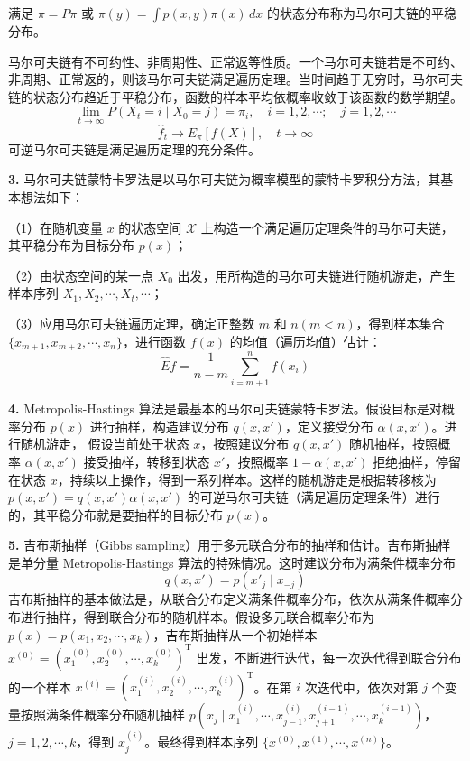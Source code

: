 \documentclass[UTF8,12pt,a4paper,fontset=fandol]{ctexart}
\begin{document}
满足 $\pi=P\pi$ 或 $\pi(y)=\int p(x,y)\pi(x)\,dx$ 的状态分布称为马尔可夫链的平稳分布。

马尔可夫链有不可约性、非周期性、正常返等性质。一个马尔可夫链若是不可约、非周期、正常返的，则该马尔可夫链满足遍历定理。当时间趋于无穷时，马尔可夫链的状态分布趋近于平稳分布，函数的样本平均依概率收敛于该函数的数学期望。
\[
\lim_{t\to\infty}P(X_t=i\mid X_0=j)=\pi_i,\quad i=1,2,\cdots;\quad j=1,2,\cdots
\]
\[
\hat f_t\to E_\pi[f(X)],\quad t\to\infty
\]
可逆马尔可夫链是满足遍历定理的充分条件。

\noindent\textbf{3.} 马尔可夫链蒙特卡罗法是以马尔可夫链为概率模型的蒙特卡罗积分方法，其基本想法如下：

（1）在随机变量 $x$ 的状态空间 $\mathcal{X}$ 上构造一个满足遍历定理条件的马尔可夫链，其平稳分布为目标分布 $p(x)$；

（2）由状态空间的某一点 $X_0$ 出发，用所构造的马尔可夫链进行随机游走，产生样本序列 $X_1,X_2,\cdots,X_t,\cdots$；

（3）应用马尔可夫链遍历定理，确定正整数 $m$ 和 $n(m<n)$，得到样本集合 $\{x_{m+1},x_{m+2},\cdots,x_n\}$，进行函数 $f(x)$ 的均值（遍历均值）估计：
\[
\hat E f=\frac{1}{n-m}\sum_{i=m+1}^{n}f(x_i)
\]

\noindent\textbf{4.} Metropolis-Hastings 算法是最基本的马尔可夫链蒙特卡罗法。假设目标是对概率分布 $p(x)$ 进行抽样，构造建议分布 $q(x,x')$，定义接受分布 $\alpha(x,x')$。进行随机游走，
假设当前处于状态 $x$，按照建议分布 $q(x,x')$ 随机抽样，按照概率 $\alpha(x,x')$ 接受抽样，转移到状态 $x'$，按照概率 $1-\alpha(x,x')$ 拒绝抽样，停留在状态 $x$，持续以上操作，得到一系列样本。这样的随机游走是根据转移核为 $p(x,x')=q(x,x')\alpha(x,x')$ 的可逆马尔可夫链（满足遍历定理条件）进行的，其平稳分布就是要抽样的目标分布 $p(x)$。

\noindent\textbf{5.} 吉布斯抽样（Gibbs sampling）用于多元联合分布的抽样和估计。吉布斯抽样是单分量 Metropolis-Hastings 算法的特殊情况。这时建议分布为满条件概率分布
\[
q(x,x')=p(x'_j\mid x_{-j})
\]
吉布斯抽样的基本做法是，从联合分布定义满条件概率分布，依次从满条件概率分布进行抽样，得到联合分布的随机样本。假设多元联合概率分布为 $p(x)=p(x_1,x_2,\cdots,x_k)$，吉布斯抽样从一个初始样本 $x^{(0)}=(x_1^{(0)},x_2^{(0)},\cdots,x_k^{(0)})^{\mathrm{T}}$ 出发，不断进行迭代，每一次迭代得到联合分布的一个样本 $x^{(i)}=(x_1^{(i)},x_2^{(i)},\cdots,x_k^{(i)})^{\mathrm{T}}$。在第 $i$ 次迭代中，依次对第 $j$ 个变量按照满条件概率分布随机抽样 $p(x_j\mid x_1^{(i)},\cdots,x_{j-1}^{(i)},x_{j+1}^{(i-1)},\cdots,x_k^{(i-1)})$，$j=1,2,\cdots,k$，得到 $x_j^{(i)}$。最终得到样本序列 $\{x^{(0)},x^{(1)},\cdots,x^{(n)}\}$。
\end{document}
